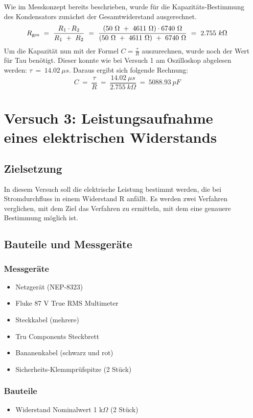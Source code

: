 \documentclass[a4paper,12pt]{article}
\begin{document}
\noindent Wie im Messkonzept bereits beschrieben, wurde für die Kapazitäts-Bestimmung des Kondensators zunächst der Gesamtwiderstand ausgerechnet.
\[
R\textsubscript{ges}~=~\frac{R\textsubscript{1} \cdot R\textsubscript{2}}{R\textsubscript{1}~+~R\textsubscript{2}}~=~\frac{(50~\Omega~+~4611~\Omega) \cdot 6740~\Omega}{(50~\Omega~+~4611~\Omega)~+~6740~\Omega}~=~2.755~k\Omega
\]
Um die Kapazität nun mit der Formel \(C=\frac{\tau}{R}\) auszurechnen, wurde noch der Wert für Tau benötigt. Dieser konnte wie bei Versuch 1 am Oszilloskop abgelesen werden: $\tau~=~14.02~\mu s$. Daraus ergibt sich folgende Rechnung:
\[
C~=~\frac{\tau}{R}~=~\frac{14.02~\mu s}{2.755~k\Omega}~=~5088.93~pF
\]





\newpage
\section{Versuch 3: Leistungsaufnahme eines elektrischen Widerstands}
\subsection{Zielsetzung}
In diesem Versuch soll die elektrische Leistung bestimmt werden, die bei Stromdurchfluss in
einem Widerstand R anfällt. Es werden zwei Verfahren verglichen, mit dem Ziel das Verfahren zu ermitteln, mit dem eine genauere Bestimmung möglich ist.

\subsection{Bauteile und Messgeräte}
\subsubsection*{Messgeräte}
\begin{itemize}
\item Netzgerät (NEP-8323)
\item Fluke 87 V True RMS Multimeter
\item Steckkabel (mehrere)
\item Tru Components Steckbrett
\item Bananenkabel (schwarz und rot)
\item Sicherheits-Klemmprüfspitze (2 Stück)
\end{itemize}

\subsubsection*{Bauteile}
\begin{itemize}
\item Widerstand Nominalwert 1 k$\Omega$ (2 Stück)
\end{itemize}
\end{document}
